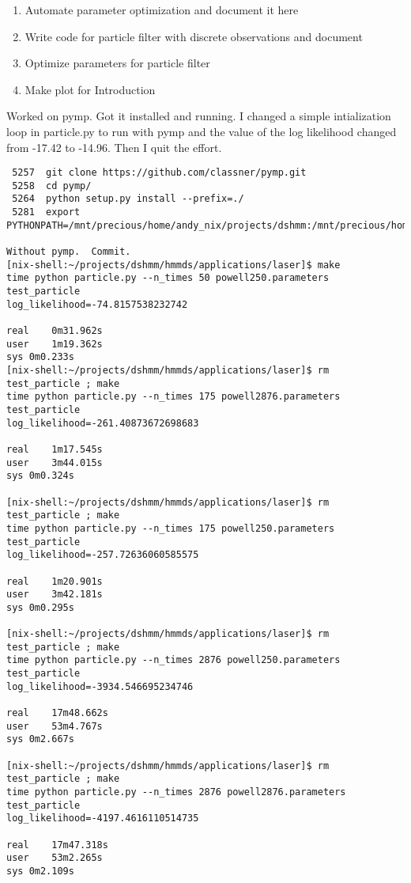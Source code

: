 \documentclass[12pt]{article}
\begin{document}
\begin{enumerate}
\item Automate parameter optimization and document it here
\item Write code for particle filter with discrete observations and document
\item Optimize parameters for particle filter
\item Make plot for Introduction
\end{enumerate}
Worked on pymp.  Got it installed and running.  I changed a simple
intialization loop in particle.py to run with pymp and the value of
the log likelihood changed from -17.42 to -14.96.  Then I quit the
effort.
\begin{verbatim}
 5257  git clone https://github.com/classner/pymp.git
 5258  cd pymp/
 5264  python setup.py install --prefix=./
 5281  export PYTHONPATH=/mnt/precious/home/andy_nix/projects/dshmm:/mnt/precious/home/andy_nix/projects/proj_hmm/src:/mnt/precious/home/andy_nix/projects/dshmm:/mnt/precious/home/andy_nix/projects/dshmm/pymp:

Without pymp.  Commit.
[nix-shell:~/projects/dshmm/hmmds/applications/laser]$ make
time python particle.py --n_times 50 powell250.parameters test_particle
log_likelihood=-74.8157538232742

real	0m31.962s
user	1m19.362s
sys	0m0.233s
[nix-shell:~/projects/dshmm/hmmds/applications/laser]$ rm test_particle ; make
time python particle.py --n_times 175 powell2876.parameters test_particle
log_likelihood=-261.40873672698683

real	1m17.545s
user	3m44.015s
sys	0m0.324s

[nix-shell:~/projects/dshmm/hmmds/applications/laser]$ rm test_particle ; make
time python particle.py --n_times 175 powell250.parameters test_particle
log_likelihood=-257.72636060585575

real	1m20.901s
user	3m42.181s
sys	0m0.295s

[nix-shell:~/projects/dshmm/hmmds/applications/laser]$ rm test_particle ; make
time python particle.py --n_times 2876 powell250.parameters test_particle
log_likelihood=-3934.546695234746

real	17m48.662s
user	53m4.767s
sys	0m2.667s

[nix-shell:~/projects/dshmm/hmmds/applications/laser]$ rm test_particle ; make
time python particle.py --n_times 2876 powell2876.parameters test_particle
log_likelihood=-4197.4616110514735

real	17m47.318s
user	53m2.265s
sys	0m2.109s


\end{verbatim}
\end{document}
